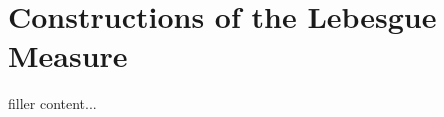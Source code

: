 \section{Constructions of the Lebesgue Measure}\label{sec:constructions-of-the-lebesgue-measure}

filler content...

